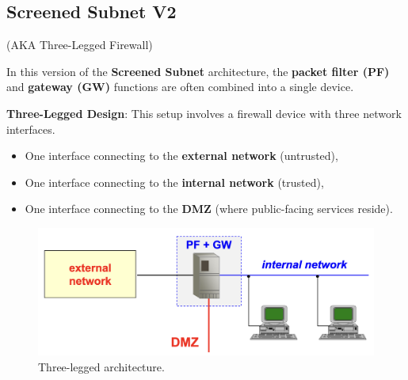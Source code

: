 \subsection{Screened Subnet V2}
\begin{center}
    (AKA Three-Legged Firewall)
\end{center}

\noindent In this version of the \textbf{Screened Subnet} architecture, the \textbf{packet filter (PF)} and \textbf{gateway (GW)} functions are often combined into a single device.

\hfill 

\noindent\textbf{Three-Legged Design}: This setup involves a firewall device with three network interfaces.
\begin{itemize}
    \item One interface connecting to the \textbf{external network} (untrusted),
    \item One interface connecting to the \textbf{internal network} (trusted),
    \item One interface connecting to the \textbf{DMZ} (where public-facing services reside).
\end{itemize}

\begin{figure}[H]
    \centering
    \includegraphics[width=0.5\linewidth]{Images/Firewalling/screened_subnet_v2.png}
    \caption{Three-legged architecture.}
\end{figure}

